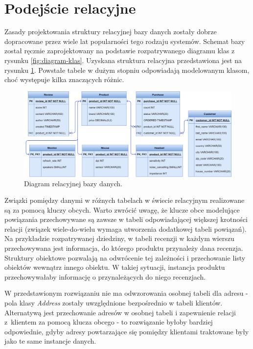 \documentclass[a4paper,twoside,12pt]{book}
\begin{document}
\section{Podejście relacyjne}
\label{section:badania-relational}

Zasady projektowania struktury relacyjnej bazy danych zostały dobrze dopracowane przez wiele lat popularności tego rodzaju systemów. Schemat bazy został ręcznie zaprojektowany na podstawie rozpatrywanego diagramu klas z rysunku \ref{fig:diagram-klas}. Uzyskana struktura relacyjna przedstawiona jest na rysunku \ref{fig:diagram-rel}. Powstałe tabele w dużym stopniu odpowiadają modelowanym klasom, choć występuje kilka znaczących różnic.

\begin{figure}[!h]
    \centering
    \includegraphics[width=15.1cm]{images/d2_v2.png}
    \caption{Diagram relacyjnej bazy danych.}
    \label{fig:diagram-rel}
\end{figure}

Związki pomiędzy danymi w różnych tabelach w świecie relacyjnym realizowane są za pomocą kluczy obcych. Warto zwrócić uwagę, że klucze obce modelujące powiązania przechowywane są zawsze w tabeli odpowiadającej większej krotności relacji (związek wiele-do-wielu wymaga utworzenia dodatkowej tabeli powiązań). Na przykładzie rozpatrywanej dziedziny, w tabeli recenzji w każdym wierszu przechowywana jest informacja, do którego produktu przynależy dana recenzja. Struktury obiektowe pozwalają na odwrócenie tej zależności i przechowanie listy obiektów wewnątrz innego obiektu. W takiej sytuacji, instancja produktu przechowywałaby informację o przynależących do niego recenzjach.

W przedstawionym rozwiązaniu nie ma odwzorowania osobnej tabeli dla adresu - pola klasy \textit{Address} zostały uwzględnione bezpośrednio w tabeli klientów. Alternatywą jest przechowanie adresów w osobnej tabeli i zapewnienie relacji z~klientem za pomocą klucza obcego - to rozwiązanie byłoby bardziej odpowiednie, gdyby adresy powtarzające się pomiędzy klientami traktowane były jako te same instancje danych.   
\end{document}
